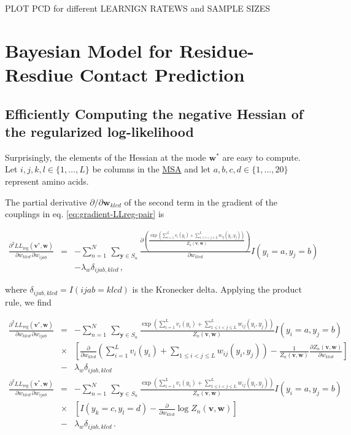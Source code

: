\documentclass[12pt,a4paper,twoside]{book}
\newcommand{\eq}{\!=\!}
\newcommand{\LLreg}{L\!L_\mathrm{reg}}
\newcommand{\Sn}{S_n}
\renewcommand{\v}{\mathbf{v}}
\newcommand{\w}{\mathbf{w}}
\newcommand{\wijab}{w_{ijab}}
\newcommand{\wklcd}{w_{klcd}}
\theoremstyle{definition}
\theoremstyle{definition}
\theoremstyle{remark}
\begin{document}
PLOT PCD for different LEARNIGN RATEWS and SAMPLE SIZES

\section{Bayesian Model for Residue-Resdiue Contact
Prediction}\label{bayesian-model-for-residue-resdiue-contact-prediction}

\subsection{Efficiently Computing the negative Hessian of the
regularized log-likelihood}\label{neg-Hessian-computation}

Surprisingly, the elements of the Hessian at the mode \(\w^*\) are easy
to compute. Let \(i,j,k,l \in \{1,\ldots,L\}\) be columns in the
\protect\hyperlink{abbrev}{MSA} and let
\(a, b, c, d \in \{1,\ldots,20\}\) represent amino acids.

The partial derivative \(\partial / \partial \w_{klcd}\) of the second
term in the gradient of the couplings in eq.
\eqref{eq:gradient-LLreg-pair} is

\begin{eqnarray}
    \frac{\partial^2 \LLreg(\v^*,\w)}{\partial \wklcd \, \partial \wijab } 
    &=&  - \sum_{n=1}^{N} \, \sum_{\mathbf{y} \in \Sn} \frac{\partial \left( \frac{\exp \left( \sum_{i=1}^L v_i(y_i) + \sum_{1 \le i < j \le L}^L w_{ij}(y_i,y_j) \right) }{Z_n(\v,\w)} \right)}{\partial \wklcd}   I(y_i \eq a, y_j \eq b) \\
    &&- \lambda_w \delta_{ijab,klcd} \,,
\end{eqnarray}

where \(\delta_{ijab,klcd} = I(ijab=klcd)\) is the Kronecker delta.
Applying the product rule, we find

\begin{eqnarray}
    \frac{\partial^2 \LLreg(\v^*,\w)}{\partial \wklcd \, \partial \wijab  } 
    &=&  - \sum_{n=1}^{N} \, \sum_{\mathbf{y} \in \Sn} \frac{\exp \left(\sum_{i=1}^L v_i(y_i) + \sum_{1 \le i < j \le L}^L w_{ij}(y_i,y_j)  \right)}{Z_n(\v,\w)}  I(y_i \eq a, y_j \eq b) \\
    & \times & \left[ \frac{\partial}{\partial \wklcd} \left( \sum_{i=1}^L v_i(y_i) + \sum_{1 \le i < j \le L}  w_{ij}(y_i,y_j)  \right) 
                  - \frac{1}{Z_n(\v,\w)} \frac{\partial  Z_n(\v,\w) }{\partial\wklcd} \right] \\
    &-& \lambda_w \delta_{ijab,klcd} \\
    \frac{\partial^2 \LLreg(\v^*,\w)}{\partial \wklcd \, \partial \wijab  } 
    &=&  - \sum_{n=1}^{N} \, \sum_{\mathbf{y} \in \Sn} \frac{\exp \left(\sum_{i=1}^L v_i(y_i) + \sum_{1 \le i < j \le L}^L w_{ij}(y_i,y_j)  \right)}{Z_n(\v,\w)}  I(y_i \eq a, y_j \eq b) \\
    & \times & \left[ I(y_k \eq c, y_l \eq d) - \frac{\partial}{\partial \wklcd} \log Z_n(\v,\w) \right] \\
    &-& \lambda_w \delta_{ijab,klcd} \,.
\end{eqnarray}
\end{document}
